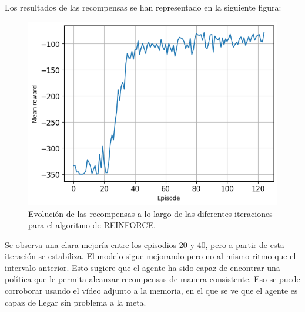 \documentclass[12pt]{article}
\begin{document}
		Los resultados de las recompensas se han representado en la siguiente figura:
		\begin{figure}[H]
			\centering
			\includegraphics[width = 0.5\linewidth]{Imagenes/outputREINFORCE.png}
			\caption{Evolución de las recompensas a lo largo de las diferentes iteraciones para el algoritmo de REINFORCE.}
			\label{f:reinforce}
		\end{figure}
		Se observa una clara mejoría entre los episodios 20 y 40, pero a partir de esta iteración se estabiliza. El modelo sigue mejorando pero no al mismo ritmo que el intervalo anterior. Esto sugiere que el agente ha sido capaz de encontrar una política que le permita alcanzar recompensas de manera consistente. Eso se puede corroborar usando el vídeo adjunto a la memoria, en el que se ve que el agente es capaz de llegar sin problema a la meta.
\end{document}
